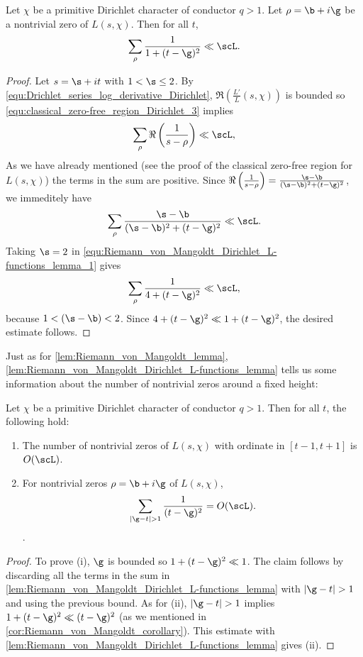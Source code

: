       \begin{lemma}\label{lem:Riemann_von_Mangoldt_Dirichlet_L-functions_lemma}
        Let $\chi$ be a primitive Dirichlet character of conductor $q > 1$. Let $\rho = \b+i\g$ be a nontrivial zero of $L(s,\chi)$. Then for all $t$,
        \[
          \sum_{\rho}\frac{1}{1+(t-\g)^{2}} \ll \scL.
        \]
      \end{lemma}
      \begin{proof}
        Let $s = \s+it$ with $1 < \s \le 2$. By \cref{equ:Drichlet_series_log_derivative_Dirichlet}, $\Re\left(\frac{L'}{L}(s,\chi)\right)$ is bounded so \cref{equ:classical_zero-free_region_Dirichlet_3} implies
        \[
          \sum_{\rho}\Re\left(\frac{1}{s-\rho}\right) \ll \scL,
        \]
        As we have already mentioned (see the proof of the classical zero-free region for $L(s,\chi)$) the terms in the sum are positive. Since $\Re\left(\frac{1}{s-\rho}\right) = \frac{\s-\b}{(\s-\b)^{2}+(t-\g)^{2}}$, we immeditely have
        \begin{equation}\label{equ:Riemann_von_Mangoldt_Dirichlet_L-functions_lemma_1}
          \sum_{\rho}\frac{\s-\b}{(\s-\b)^{2}+(t-\g)^{2}} \ll \scL.
        \end{equation}
        Taking $\s = 2$ in \cref{equ:Riemann_von_Mangoldt_Dirichlet_L-functions_lemma_1} gives
        \[
          \sum_{\rho}\frac{1}{4+(t-\g)^{2}} \ll \scL,
        \]
        because $1 < (\s-\b) < 2$. Since $4+(t-\g)^{2} \ll 1+(t-\g)^{2}$, the desired estimate follows.
      \end{proof}

      Just as for \cref{lem:Riemann_von_Mangoldt_lemma}, \cref{lem:Riemann_von_Mangoldt_Dirichlet_L-functions_lemma} tells us some information about the number of nontrivial zeros around a fixed height:

      \begin{corollary}\label{cor:Riemann_von_Mangoldt_Dirichlet_L-functions_corollary}
        Let $\chi$ be a primitive Dirichlet character of conductor $q > 1$. Then for all $t$, the following hold:
        \begin{enumerate}[label=(\roman*)]
          \item The number of nontrivial zeros of $L(s,\chi)$ with ordinate in $[t-1,t+1]$ is $O(\scL)$.
          \item For nontrivial zeros $\rho = \b+i\g$ of $L(s,\chi)$,
          \[
            \sum_{|\g-t| > 1}\frac{1}{(t-\g)^{2}} = O(\scL).
          \].
        \end{enumerate}
      \end{corollary}
      \begin{proof}
        To prove (i), $\g$ is bounded so $1+(t-\g)^{2} \ll 1$. The claim follows by discarding all the terms in the sum in \cref{lem:Riemann_von_Mangoldt_Dirichlet_L-functions_lemma} with $|\g-t| > 1$ and using the previous bound. As for (ii), $|\g-t| > 1$ implies $1+(t-\g)^{2} \ll (t-\g)^{2}$ (as we mentioned in \cref{cor:Riemann_von_Mangoldt_corollary}). This estimate with \cref{lem:Riemann_von_Mangoldt_Dirichlet_L-functions_lemma} gives (ii).
      \end{proof}


